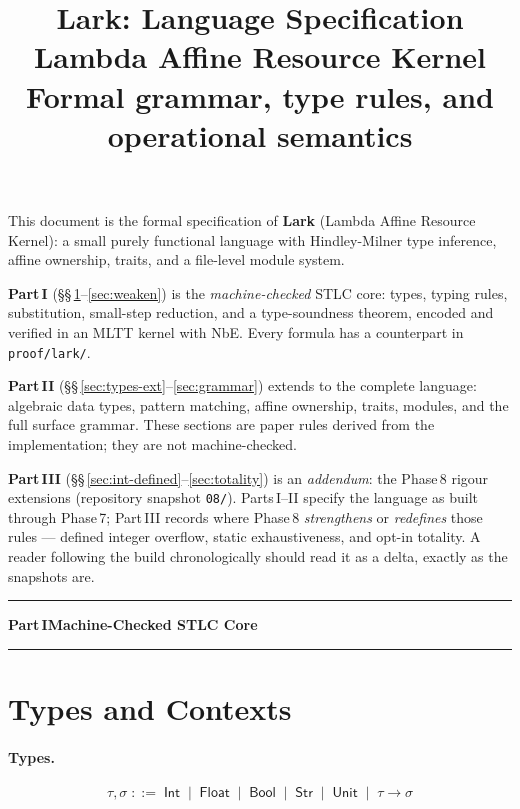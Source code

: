 \documentclass[10pt,a4paper]{article}
\title{\textbf{Lark: Language Specification}\\[6pt]
       \large Lambda Affine Resource Kernel\\[4pt]
       \normalsize Formal grammar, type rules, and operational semantics}
\author{}
\date{}
\newcommand{\TInt}{\mathsf{Int}}
\newcommand{\TFlt}{\mathsf{Float}}
\newcommand{\TBool}{\mathsf{Bool}}
\newcommand{\TStr}{\mathsf{Str}}
\newcommand{\TUnit}{\mathsf{Unit}}
\theoremstyle{plain}
\theoremstyle{definition}
\theoremstyle{remark}
\begin{document}
\maketitle\thispagestyle{empty}

\noindent
This document is the formal specification of \textbf{Lark} (Lambda Affine
Resource Kernel): a small purely functional language with Hindley-Milner type
inference, affine ownership, traits, and a file-level module system.

\smallskip
\noindent\textbf{Part\,I} (\S\S\,\ref{sec:types}--\ref{sec:weaken}) is the
\emph{machine-checked} STLC core: types, typing rules, substitution, small-step
reduction, and a type-soundness theorem, encoded and verified in an MLTT kernel
with NbE.  Every formula has a counterpart in \texttt{proof/lark/}.

\smallskip
\noindent\textbf{Part\,II} (\S\S\,\ref{sec:types-ext}--\ref{sec:grammar})
extends to the complete language: algebraic data types, pattern matching, affine
ownership, traits, modules, and the full surface grammar.  These sections are
paper rules derived from the implementation; they are not machine-checked.

\smallskip
\noindent\textbf{Part\,III} (\S\S\,\ref{sec:int-defined}--\ref{sec:totality})
is an \emph{addendum}: the Phase\,8 rigour extensions (repository snapshot
\texttt{08/}).  Parts\,I--II specify the language as built through Phase\,7;
Part\,III records where Phase\,8 \emph{strengthens} or \emph{redefines} those
rules --- defined integer overflow, static exhaustiveness, and opt-in totality.
A reader following the build chronologically should read it as a delta,
exactly as the snapshots are.

\medskip\noindent\rule{\linewidth}{0.4pt}
{\centering\normalsize\bfseries Part\,I\quad Machine-Checked STLC Core\par}
\noindent\rule{\linewidth}{0.4pt}\medskip

\section{Types and Contexts}
\label{sec:types}

\paragraph{Types.}
\[
\tau,\sigma \;::=\; \TInt \;\mid\; \TFlt \;\mid\; \TBool \;\mid\; \TStr
            \;\mid\; \TUnit \;\mid\; \tau \to \sigma
\]
\end{document}
